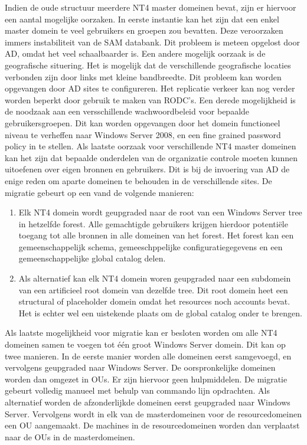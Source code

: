 Indien de oude structuur meerdere NT4 master domeinen bevat, zijn er hiervoor
een aantal mogelijke oorzaken. In eerste instantie kan het zijn dat een enkel
master domein te veel gebruikers en groepen zou bevatten. Deze veroorzaken
immers instabiliteit van de SAM databank. Dit probleem is meteen opgelost door
AD, omdat het veel schaalbaarder is. Een andere mogelijk oorzaak is de
geografische situering. Het is mogelijk dat de verschillende geografische
locaties verbonden zijn door links met kleine bandbreedte. Dit probleem kan
worden opgevangen door AD sites te configureren. Het replicatie verkeer kan nog
verder worden beperkt door gebruik te maken van RODC's. Een derede mogelijkheid
is de noodzaak aan een versschillende wachwoordbeleid voor bepaalde
gebruikersgroepen. Dit kan worden opgevangen door het domein functioneel niveau
te verheffen naar Windows Server 2008, en een fine grained password policy in te
stellen. Als laatste oorzaak voor verschillende NT4 master domeinen kan het zijn
dat bepaalde onderdelen van de organizatie controle moeten kunnen uitoefenen
over eigen bronnen en gebruikers. Dit is bij de invoering van AD de enige reden
om aparte domeinen te behouden in de verschillende sites. De migratie gebeurt op
een vand de volgende manieren:
\begin{enumerate}
	\item Elk NT4 domein wordt geupgraded naar de root van een Windows
		Server tree in hetzelfde forest. Alle gemachtigde gebruikers
		krijgen hierdoor potentiële toegang tot alle bronnen in alle
		domeinen van het forest. Het forest kan een gemeenschappelijk
		schema, gemeeschppelijke configuratiegegevens en een
		gemeenschappelijke global catalog delen.
	\item Als alternatief kan elk NT4 domein woren geupgraded naar een
		subdomein van een artificieel root domein van dezelfde tree. Dit
		root domein heet een structural of placeholder domein omdat het
		resources noch accounts bevat. Het is echter wel een uistekende
		plaats om de global catalog onder te brengen.
\end{enumerate}

Als laatste mogelijkheid voor migratie kan er besloten worden om alle NT4
domeinen samen te voegen tot één groot Windows Server domein. Dit kan op twee
manieren. In de eerste manier worden alle domeinen eerst samgevoegd, en
vervolgens geupgraded naar Windows Server. De oorspronkelijke domeinen worden
dan omgezet in OUs. Er zijn hiervoor geen hulpmiddelen. De migratie gebeurt
volledig manueel met behulp van commando lijn opdrachten. Als alternatief worden
de afzonderlijkde domeinen eerst geupgraded naar Windows Server. Vervolgens
wordt in elk van de masterdomeinen voor de resourcedomeinen een OU aangemaakt.
De machines in de resourcedomeinen worden dan verplaatst naar de OUs in de
masterdomeinen.
